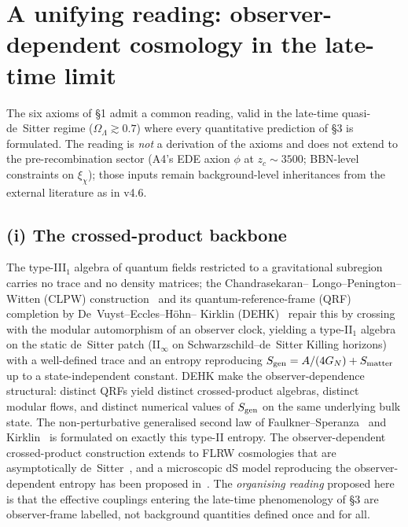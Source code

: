 %

\section{A unifying reading: observer-dependent cosmology in the late-time limit}
\label{sec:thesis}

The six axioms of \S1 admit a common reading, valid in the late-time
quasi-de~Sitter regime ($\Omega_\Lambda \gtrsim 0.7$) where every
quantitative prediction of \S3 is formulated. The reading is \emph{not} a
derivation of the axioms and does not extend to the pre-recombination
sector (A4's EDE axion $\phi$ at $z_c\sim 3500$; BBN-level constraints on
$\xi_\chi$); those inputs remain background-level inheritances from the
external literature as in v4.6.

\subsection*{(i) The crossed-product backbone}

The type-III$_1$ algebra of quantum fields restricted to a gravitational
subregion carries no trace and no density matrices; the Chandrasekaran--
Longo--Penington--Witten (CLPW) construction~\cite{CLPW2023} and its
quantum-reference-frame (QRF) completion by De~Vuyst--Eccles--H\"ohn--
Kirklin (DEHK)~\cite{DEHK2025a,DEHK2025b} repair this by crossing with the
modular automorphism of an observer clock, yielding a type-II$_1$ algebra on
the static de~Sitter patch (II$_\infty$ on Schwarzschild--de~Sitter
Killing horizons) with a well-defined trace and an entropy reproducing
$S_{\rm gen} = A/(4G_N) + S_{\rm matter}$ up to a state-independent
constant. DEHK make the observer-dependence structural: distinct QRFs
yield distinct crossed-product algebras, distinct modular flows, and
distinct numerical values of $S_{\rm gen}$ on the same underlying bulk
state. The non-perturbative generalised second law of
Faulkner--Speranza~\cite{FaulknerSperanza2024} and
Kirklin~\cite{Kirklin2025} is formulated on exactly this type-II entropy.
The observer-dependent crossed-product construction extends to FLRW
cosmologies that are asymptotically de~Sitter~\cite{KFLS2024}, and a
microscopic dS model reproducing the observer-dependent entropy has been
proposed in~\cite{TiettoVerlinde2025}. The \emph{organising reading}
proposed here is that the effective couplings entering the late-time
phenomenology of \S3 are observer-frame labelled, not background
quantities defined once and for all.

